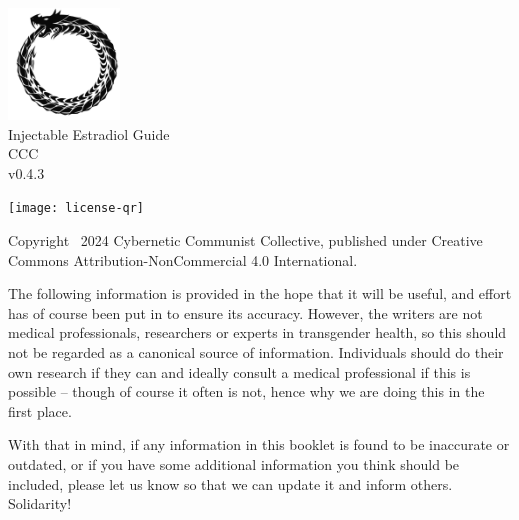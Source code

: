 \documentclass[twoside,a5paper]{article}
\begin{document}
\newcommand{\qrwidth}{6em}

\begin{titlepage}
  \null\vspace{2em}
  \setcounter{page}{0}
  \begin{center}
    \includegraphics[width=8em]{ouroboros} \\
    \vspace{3em}
    {\LARGE Injectable Estradiol Guide \\}
    \vspace{2em}
    {\large CCC \\}
    \vspace{0.6em}
    {\large v0.4.3 \\}
  \end{center}
\end{titlepage}

\setcounter{page}{1}

\begin{center}
  \null\vfill
  \texttt{[image: license-qr]} \\
  \vspace{1.2em}
  \parbox{0.8\textwidth}{
    \small
    Copyright \textcopyright\ 2024 Cybernetic Communist Collective,
    published under Creative Commons Attribution-NonCommercial 4.0
    International.
  }
  \vfill
\end{center}

\newpage
\tableofcontents
\listoftables
\listoffigures

\newpage
{}

\noindent The following information is provided in the hope that it
will be useful, and effort has of course been put in to ensure its
accuracy.  However, the writers are not medical professionals,
researchers or experts in transgender health, so this should not be
regarded as a canonical source of information.  Individuals should do
their own research if they can and ideally consult a medical
professional if this is possible -- though of course it often is not,
hence why we are doing this in the first place.

With that in mind, if any information in this booklet is found to be
inaccurate or outdated, or if you have some additional information
you think should be included, please let us know so that we can update
it and inform others.  Solidarity!
\end{document}
